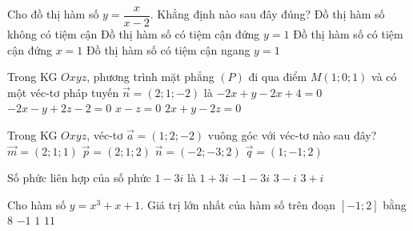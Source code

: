\begin{ex}%
Cho đồ thị hàm số $y=\dfrac{x}{x-2}$. Khẳng định nào sau đây đúng?
\choice
{Đồ thị hàm số không có tiệm cận}
{Đồ thị hàm số có tiệm cận đứng $y=1$}
{Đồ thị hàm số có tiệm cận đứng $x=1$}
{\True Đồ thị hàm số có tiệm cận ngang $y=1$}
\end{ex}


\begin{ex}%
Trong KG $Oxyz$, phương trình mặt phẳng $(P)$ đi qua điểm $M\left(1;0;1\right)$ và có một  véc-tơ pháp tuyến $\overrightarrow{n}=\left(2;1;-2\right)$ là
\choice
{$-2x+y-2x+4=0$}
{$-2x-y+2z-2=0$}
{$x-z=0$}
{\True $2x+y-2z=0$}
\end{ex}


\begin{ex}%
Trong KG $Oxyz$, véc-tơ $\overrightarrow{a}=(1;2;-2)$ vuông góc với véc-tơ nào sau đây?
\choice
{$\overrightarrow{m}=(2;1;1)$}
{\True $\overrightarrow{p}=(2;1;2)$}
{$\overrightarrow{n}=(-2;-3;2)$}
{$\overrightarrow{q}=(1;-1;2)$}
\end{ex}


\begin{ex}%
Số phức liên hợp của số phức $1-3i$ là
\choice
{\True $1+3i$}
{$-1-3i$}
{$3-i$}
{$3+i$}
\end{ex}


\begin{ex}%
Cho hàm số $y=x^3+x+1$. Giá trị lớn nhất của hàm số trên đoạn $[-1;2]$ bằng 
\choice
{$8$}
{$-1$}
{$1$}
{\True $11$}
\end{ex}


